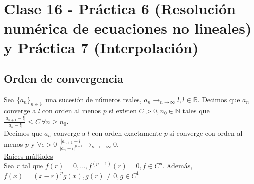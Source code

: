 \section{Clase 16 - Pr\'actica 6 (Resoluci\'on num\'erica de ecuaciones no lineales) y Pr\'actica 7 (Interpolaci\'on)}

\subsection{Orden de convergencia}

Sea $\{a_{n}\}_{n \in \mathbb{N}}$ una sucesi\'on de n\'umeros reales, $a_{n} \rightarrow_{n \to \infty} l, l \in \mathbb{R}$. Decimos que $a_{n}$ converge a $l$ con orden al menos $p$ si existen $C > 0, n_{0} \in \mathbb{N}$ tales que $\frac{|a_{n + 1} - l|}{|a_{n} - l|} \leq C\ \forall n \geq n_{0}$.\\

Decimos que $a_{n}$ converge a $l$ con orden exactamente $p$ si converge con orden al menos $p$ y $\forall \epsilon > 0$ $\frac{|a_{n + 1} - l|}{|a_{n} - l|^{p - \epsilon}} \rightarrow_{n \to +\infty} 0$.\\

\underline{Ra\'ices m\'ultiples}\\

Sea $r$ tal que $f(r) = 0, ..., f^{(p - 1)}(r) = 0, f \in C^{p}$. Adem\'as, $f(x) = (x - r)^{p}g(x), g(r) \neq 0, g \in C^{1}$\\

